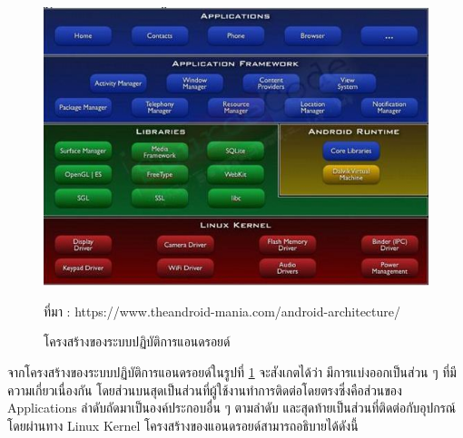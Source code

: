 	\begin{figure}[H]
		\centering
		\includegraphics[width=0.8\columnwidth]{Figures/2/androidarchitecture}
		\caption{โครงสร้างของระบบปฏิบัติการแอนดรอยด์}{ที่มา : https://www.theandroid-mania.com/android-architecture/}
		\label{Fig:androidarchitecture}
	\end{figure}
	จากโครงสร้างของระบบปฏิบัติการแอนดรอยด์ในรูปที่ \ref{Fig:androidarchitecture} จะสังเกตได้ว่า มีการแบ่งออกเป็นส่วน ๆ ที่มีความเกี่ยวเนื่องกัน โดยส่วนบนสุดเป็นส่วนที่ผู้ใช้งานทำการติดต่อโดยตรงซึ่งคือส่วนของ Applications ลำดับถัดมาเป็นองค์ประกอบอื่น ๆ ตามลำดับ และสุดท้ายเป็นส่วนที่ติดต่อกับอุปกรณ์โดยผ่านทาง Linux Kernel โครงสร้างของแอนดรอยด์สามารถอธิบายได้ดังนี้

